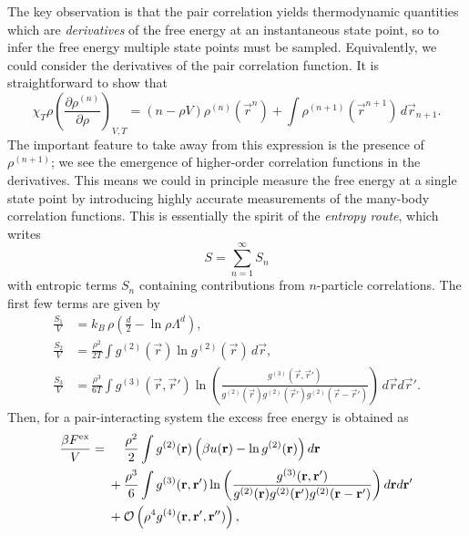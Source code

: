 \documentclass[11pt,twoside]{report}
\begin{document}
The key observation is that the pair correlation yields thermodynamic quantities which are \emph{derivatives} of the free energy at an instantaneous state point, so to infer the free energy multiple state points must be sampled.
Equivalently, we could consider the derivatives of the pair correlation function.
It is straightforward to show that \cite{Santos2016}
\begin{equation}\label{eq:correlation-derivatives}
  \chi_T \rho
  \left( \frac{\partial \rho^{(n)}}{\partial \rho} \right)_{V,T}
  =
  (n - \rho V) \rho^{(n)}(\vec{r}^n)
  + \int \rho^{(n+1)}(\vec{r}^{n+1}) \, d\vec{r}_{n+1}.
\end{equation}
The important feature to take away from this expression is the presence of $\rho^{(n+1)}$; we see the emergence of higher-order correlation functions in the derivatives.
This means we could in principle measure the free energy at a single state point by introducing highly accurate measurements of the many-body correlation functions.
This is essentially the spirit of the \emph{entropy route}, which writes \cite{WallaceJCP1987}
\begin{equation}
  S = \sum_{n=1}^\infty S_n
\end{equation}
with entropic terms $S_n$ containing contributions from $n$-particle correlations.
The first few terms are given by \cite{WallaceJCP1987}
\begin{subequations}
  \begin{align}
    \frac{S_1}{V}%
    &=
    k_B \, \rho \left( \frac{d}{2} - \ln{\rho \Lambda^d} \right),
    \\
    \frac{S_2}{V}%
    &=
    \frac{\rho^2}{2 T}
    \int g^{(2)}(\vec{r}) \ln{g^{(2)}(\vec{r})}
    \, d\vec{r},
    \\
    \frac{S_3}{V}%
    &=
    \frac{\rho^3}{6 T}
    \int g^{(3)}(\vec{r}, \vec{r}')
    \ln{\left(
      \frac{
        g^{(3)}(\vec{r}, \vec{r}')
      }{
        g^{(2)}(\vec{r}) g^{(2)}(\vec{r}') g^{(2)}(\vec{r} - \vec{r}')
      }
      \right)}
    \, d\vec{r} d\vec{r}'.
  \end{align}
\end{subequations}
Then, for a pair-interacting system the excess free energy is obtained as
\begin{equation*}
  \begin{split}
    \frac{\beta F^\mathrm{ex}}{V}
    =& \; \hphantom{ + } \;\,
    \frac{\rho^2}{2} \int g^{(2)}(\vec{r})
    \left( \beta u(\vec{r}) - \ln{g^{(2)}(\vec{r})} \right)
    d\vec{r}
    \\ & \;
    + \frac{\rho^3}{6}
    \int g^{(3)}(\vec{r}, \vec{r}')
    \ln{\left(
      \frac{
        g^{(3)}(\vec{r}, \vec{r}')
      }{
        g^{(2)}(\vec{r}) g^{(2)}(\vec{r}') g^{(2)}(\vec{r} - \vec{r}')
      }
      \right)}
    \, d\vec{r} d\vec{r}'
    \\ & \;
    + \mathcal{O}\left( \rho^4 g^{(4)}(\vec{r}, \vec{r}', \vec{r}'') \right),
  \end{split}
\end{equation*}
\end{document}
